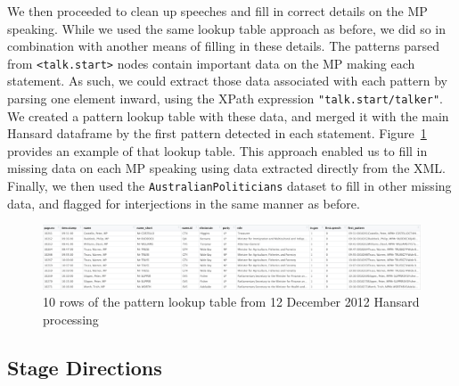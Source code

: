 \documentclass[
  letterpaper,
  DIV=11,
  numbers=noendperiod]{scrartcl}
\begin{document}
We then proceeded to clean up speeches and fill in correct details on
the MP speaking. While we used the same lookup table approach as before,
we did so in combination with another means of filling in these details.
The patterns parsed from \texttt{\textless{}talk.start\textgreater{}}
nodes contain important data on the MP making each statement. As such,
we could extract those data associated with each pattern by parsing one
element inward, using the XPath expression \texttt{"talk.start/talker"}.
We created a pattern lookup table with these data, and merged it with
the main Hansard dataframe by the first pattern detected in each
statement. Figure~\ref{fig-patterns} provides an example of that lookup
table. This approach enabled us to fill in missing data on each MP
speaking using data extracted directly from the XML. Finally, we then
used the \texttt{AustralianPoliticians} dataset to fill in other missing
data, and flagged for interjections in the same manner as before.

\begin{figure}

{\centering \includegraphics{pattern_lookup.jpg}

}

\caption{\label{fig-patterns}10 rows of the pattern lookup table from 12
December 2012 Hansard processing}

\end{figure}

\hypertarget{sec-stage}{%
\subsection{Stage Directions}\label{sec-stage}}
\end{document}
